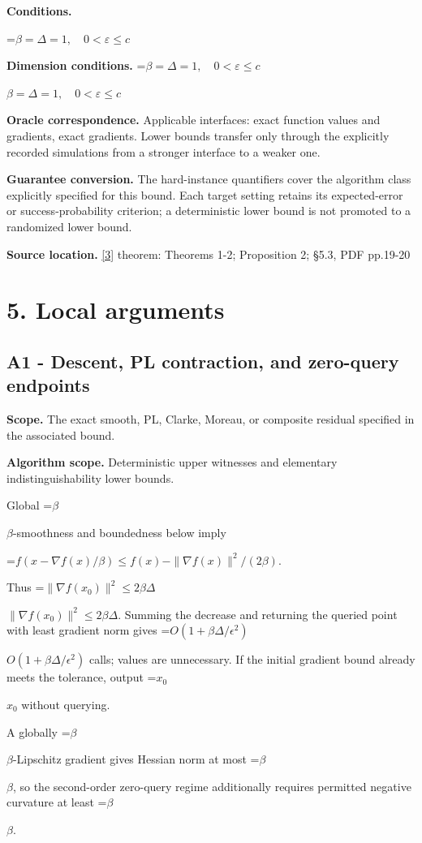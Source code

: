 \documentclass[10pt,a4paper]{article}
\newcommand{\AtlasMath}[1]{\par\begingroup\centering\setbox0=\hbox{$\displaystyle #1$}\ifdim\wd0>1.4\linewidth\typeout{ATLAS WIDE FORMULA: \the\wd0}\fi\ifdim\wd0>\linewidth\resizebox{\linewidth}{!}{\box0}\else\box0\fi\par\endgroup}
\newcommand{\AtlasInlineMath}[1]{\begingroup\setbox0=\hbox{$#1$}\ifdim\wd0>.4\linewidth\endgroup\AtlasMath{#1}\else\endgroup$#1$\fi}
\begin{document}
\textbf{Conditions.} 
\AtlasMath{\beta=\Delta=1,\quad0<\varepsilon\le c}


\textbf{Dimension conditions.} \AtlasInlineMath{\beta=\Delta=1,\quad0<\varepsilon\le c}

\textbf{Oracle correspondence.} Applicable interfaces: exact function values and gradients, exact gradients. Lower bounds transfer only through the explicitly recorded simulations from a stronger interface to a weaker one.

\textbf{Guarantee conversion.} The hard-instance quantifiers cover the algorithm class explicitly specified for this bound. Each target setting retains its expected-error or success-probability criterion; a deterministic lower bound is not promoted to a randomized lower bound.

\textbf{Source location.} \href{https://arxiv.org/pdf/1710.11606}{[3]} theorem: Theorems 1-2; Proposition 2; §5.3, PDF pp.19-20

\section{5. Local arguments}
\subsection{A1 - Descent, PL contraction, and zero-query endpoints}
\textbf{Scope.} The exact smooth, PL, Clarke, Moreau, or composite residual specified in the associated bound.

\textbf{Algorithm scope.} Deterministic upper witnesses and elementary indistinguishability lower bounds.

Global \AtlasInlineMath{\beta}-smoothness and boundedness below imply

\AtlasMath{f(x-\nabla f(x)/\beta)\le f(x)-\|\nabla f(x)\|^2/(2\beta).}

Thus \AtlasInlineMath{\|\nabla f(x_0)\|^2\le2\beta\Delta}. Summing the decrease and returning the queried point with least gradient norm gives \AtlasInlineMath{O(1+\beta\Delta/\epsilon^2)} calls; values are unnecessary. If the initial gradient bound already meets the tolerance, output \AtlasInlineMath{x_0} without querying.

A globally \AtlasInlineMath{\beta}-Lipschitz gradient gives Hessian norm at most \AtlasInlineMath{\beta}, so the second-order zero-query regime additionally requires permitted negative curvature at least \AtlasInlineMath{\beta}.
\end{document}

